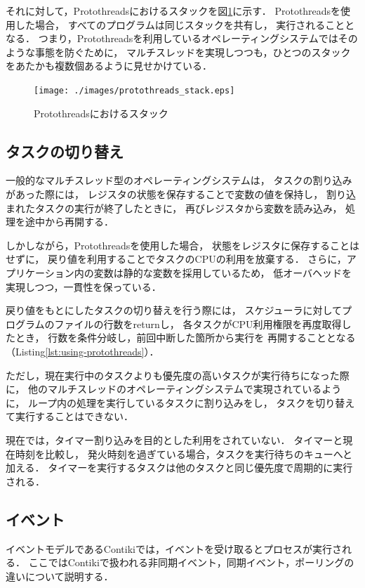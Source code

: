 それに対して，Protothreadsにおけるスタックを図\ref{fig:protothreads_stack}に示す．
Protothreadsを使用した場合，
すべてのプログラムは同じスタックを共有し，
実行されることとなる．
つまり，Protothreadsを利用しているオペレーティングシステムではそのような事態を防ぐために，
マルチスレッドを実現しつつも，ひとつのスタックをあたかも複数個あるように見せかけている．
\begin{figure}[htbp]
 \begin{center}
  \texttt{[image: ./images/protothreads\_stack.eps]}
 \end{center}
 \caption{Protothreadsにおけるスタック}
 \label{fig:protothreads_stack}
\end{figure}


\subsection{タスクの切り替え}
一般的なマルチスレッド型のオペレーティングシステムは，
タスクの割り込みがあった際には，
レジスタの状態を保存することで変数の値を保持し，
割り込まれたタスクの実行が終了したときに，
再びレジスタから変数を読み込み，
処理を途中から再開する．

しかしながら，Protothreadsを使用した場合，
状態をレジスタに保存することはせずに，
戻り値を利用することでタスクのCPUの利用を放棄する．
さらに，アプリケーション内の変数は静的な変数を採用しているため，
低オーバヘッドを実現しつつ，一貫性を保っている．

戻り値をもとにしたタスクの切り替えを行う際には，
スケジューラに対してプログラムのファイルの行数をreturnし，
各タスクがCPU利用権限を再度取得したとき，
行数を条件分岐し，前回中断した箇所から実行を
再開することとなる（Listing\ref{lst:using-protothreads}）．

ただし，現在実行中のタスクよりも優先度の高いタスクが実行待ちになった際に，
他のマルチスレッドのオペレーティングシステムで実現されているように，
ループ内の処理を実行しているタスクに割り込みをし，
タスクを切り替えて実行することはできない．

現在では，タイマー割り込みを目的とした利用をされていない．
タイマーと現在時刻を比較し，
発火時刻を過ぎている場合，タスクを実行待ちのキューへと加える．
タイマーを実行するタスクは他のタスクと同じ優先度で周期的に実行される．




\subsection{イベント}
イベントモデルであるContikiでは，イベントを受け取るとプロセスが実行される．
ここではContikiで扱われる非同期イベント，同期イベント，ポーリングの違いについて説明する．

